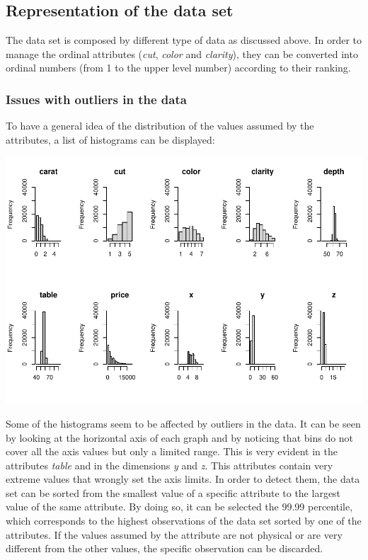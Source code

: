 \documentclass[
]{article}
\begin{document}
\subsection{Representation of the data
set}\label{representation-of-the-data-set}

The data set is composed by different type of data as discussed above.
In order to manage the ordinal attributes (\emph{cut}, \emph{color} and
\emph{clarity}), they can be converted into ordinal numbers (from 1 to
the upper level number) according to their ranking.

\subsubsection{Issues with outliers in the
data}\label{issues-with-outliers-in-the-data}

To have a general idea of the distribution of the values assumed by the
attributes, a list of histograms can be displayed:

\includegraphics{Report_files/figure-latex/unnamed-chunk-4-1.pdf}

Some of the histograms seem to be affected by outliers in the data. It
can be seen by looking at the horizontal axis of each graph and by
noticing that bins do not cover all the axis values but only a limited
range. This is very evident in the attributes \emph{table} and in the
dimensions \emph{y} and \emph{z}. This attributes contain very extreme
values that wrongly set the axis limits. In order to detect them, the
data set can be sorted from the smallest value of a specific attribute
to the largest value of the same attribute. By doing so, it can be
selected the 99.99 percentile, which corresponds to the highest
observations of the data set sorted by one of the attributes. If the
values assumed by the attribute are not physical or are very different
from the other values, the specific observation can be discarded.
\end{document}

